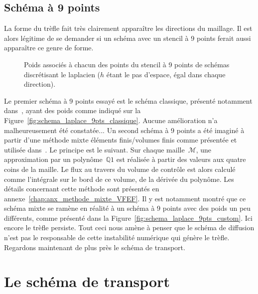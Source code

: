 \documentclass[main.tex]{subfiles}
\begin{document}
\subsection{Schéma à 9 points}
La forme du trèfle fait très clairement apparaître les directions du maillage. Il est alors légitime de se demander si un schéma avec un stencil à 9 points ferait aussi apparaître ce genre de forme. 
\begin{figure}
\caption{\label{fig:schema_laplacien}Poids associés à chacun des points du stencil à 9 points de schémas discrétisant le laplacien ($h$ étant le pas d'espace, égal dans chaque direction).}
\end{figure}
Le premier schéma à 9 points essayé est le schéma classique, présenté notamment dans~\cite{leveque2007finite}, ayant des poids comme indiqué sur la Figure~\ref{fig:schema_laplace_9pts_classique}. Aucune amélioration n'a malheureusement été constatée... Un second schéma à 9 points a été imaginé à partir d'une méthode mixte éléments finis/volumes finis comme présentée et utilisée dans~\cite{latige2013second}. Le principe est le suivant.  
Sur chaque maille~$\mathcal{M}$, une approximation par un polynôme~$\mathbb{Q}1$ est réalisée à partir des valeurs aux quatre coins de la maille. Le flux au travers du volume de contrôle est alors calculé comme l'intégrale sur le bord de ce volume, de la dérivée du polynôme. Les détails concernant cette méthode sont présentés en  annexe~\ref{chap:anx_methode_mixte_VFEF}. Il y est notamment montré que ce schéma mixte se ramène en réalité à un schéma à 9 points avec des poids un peu différents, comme présenté dans la Figure~\ref{fig:schema_laplace_9pts_custom}. 
Ici encore le trèfle persiste. Tout ceci nous amène à penser que le schéma de diffusion n'est pas le responsable de cette instabilité numérique qui génère le trèfle. Regardons maintenant de plus près le schéma de transport. 

\section{Le schéma de transport}
\end{document}
